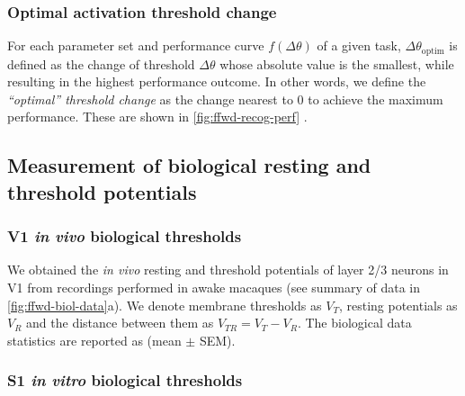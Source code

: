 \subsubsection*{Optimal activation threshold change}

For each parameter set and performance curve $f(\Delta \theta)$ of a given task,
    $\Delta \theta_{\text{optim}}$ is defined as the change of threshold $\Delta \theta$
        whose absolute value is the smallest,
        while resulting in the highest performance outcome.
    In other words, we define the \textit{``optimal'' threshold change}
        as the change nearest to 0 to achieve the maximum performance.
    These are shown in \autoref{fig:ffwd-recog-perf}
        .

\subsection{Measurement of biological resting and threshold potentials}

\subsubsection*{V1 \textit{in vivo} biological thresholds}

We obtained the \textit{in vivo} resting and threshold potentials
        of layer 2/3 neurons in V1 from recordings performed in awake macaques \citep{Li2020-ej}
        (see summary of data in \autoref{fig:ffwd-biol-data}a).
    We denote membrane thresholds as $V_T$,
        resting potentials as $V_R$
        and the distance between them as $V_{TR} = V_T - V_R$.
    The biological data statistics are reported as (mean $\pm$ SEM).

\subsubsection*{S1 \textit{in vitro} biological thresholds}


